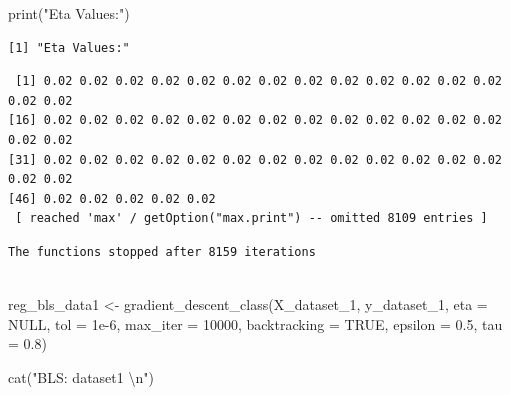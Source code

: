 \documentclass[
  letterpaper,
  DIV=11,
  numbers=noendperiod]{scrartcl}
\newenvironment{Shaded}{\begin{snugshade}}{\end{snugshade}}
\newcommand{\AttributeTok}[1]{\textcolor[rgb]{0.40,0.45,0.13}{#1}}
\newcommand{\ConstantTok}[1]{\textcolor[rgb]{0.56,0.35,0.01}{#1}}
\newcommand{\DecValTok}[1]{\textcolor[rgb]{0.68,0.00,0.00}{#1}}
\newcommand{\FloatTok}[1]{\textcolor[rgb]{0.68,0.00,0.00}{#1}}
\newcommand{\FunctionTok}[1]{\textcolor[rgb]{0.28,0.35,0.67}{#1}}
\newcommand{\NormalTok}[1]{\textcolor[rgb]{0.00,0.23,0.31}{#1}}
\newcommand{\OtherTok}[1]{\textcolor[rgb]{0.00,0.23,0.31}{#1}}
\newcommand{\SpecialCharTok}[1]{\textcolor[rgb]{0.37,0.37,0.37}{#1}}
\newcommand{\StringTok}[1]{\textcolor[rgb]{0.13,0.47,0.30}{#1}}
\begin{document}
\begin{Shaded}
\begin{Highlighting}[]
\FunctionTok{print}\NormalTok{(}\StringTok{"Eta Values:"}\NormalTok{)}
\end{Highlighting}
\end{Shaded}

\begin{verbatim}
[1] "Eta Values:"
\end{verbatim}

\begin{Shaded}
\end{Shaded}

\begin{verbatim}
 [1] 0.02 0.02 0.02 0.02 0.02 0.02 0.02 0.02 0.02 0.02 0.02 0.02 0.02 0.02 0.02
[16] 0.02 0.02 0.02 0.02 0.02 0.02 0.02 0.02 0.02 0.02 0.02 0.02 0.02 0.02 0.02
[31] 0.02 0.02 0.02 0.02 0.02 0.02 0.02 0.02 0.02 0.02 0.02 0.02 0.02 0.02 0.02
[46] 0.02 0.02 0.02 0.02 0.02
 [ reached 'max' / getOption("max.print") -- omitted 8109 entries ]
\end{verbatim}

\begin{Shaded}
\end{Shaded}

\begin{verbatim}
The functions stopped after 8159 iterations 
 
\end{verbatim}

\begin{Shaded}
\begin{Highlighting}[]
\NormalTok{reg\_bls\_data1 }\OtherTok{\textless{}{-}} \FunctionTok{gradient\_descent\_class}\NormalTok{(X\_dataset\_1, y\_dataset\_1, }\AttributeTok{eta =} \ConstantTok{NULL}\NormalTok{, }\AttributeTok{tol =} \FloatTok{1e{-}6}\NormalTok{, }\AttributeTok{max\_iter =} \DecValTok{10000}\NormalTok{, }\AttributeTok{backtracking =} \ConstantTok{TRUE}\NormalTok{, }\AttributeTok{epsilon =} \FloatTok{0.5}\NormalTok{, }\AttributeTok{tau =} \FloatTok{0.8}\NormalTok{)}

\FunctionTok{cat}\NormalTok{(}\StringTok{"BLS: dataset1 }\SpecialCharTok{\textbackslash{}n}\StringTok{"}\NormalTok{)}
\end{Highlighting}
\end{Shaded}
\end{document}
